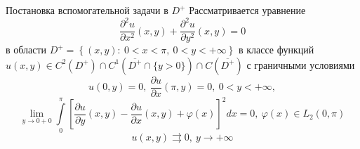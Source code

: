 \documentclass[10pt,pdf,hyperref={unicode}]{beamer}
\begin{document}
\begin{frame}{Постановка вспомогательной задачи в $D^+$}
Рассматривается уравнение
\begin{equation}
	\dfrac{\partial^2 u}{\partial x^2}(x,y) + \dfrac{\partial^2 u}{\partial y^2}(x,y) = 0
\end{equation}
в области $D^{+} = \left\{(x,y): \ 0 < x < \pi, \ 0 < y < + \infty \right\}$ в классе функций $u(x,y) \in  C^2(D^+) \cap C^1(\overline{D^+} \cap \{y > 0\}) \cap C(\overline{D^+})$ 
с граничными условиями 
\begin{equation}
	u(0,y) = 0, \ \dfrac{\partial u}{\partial x}(\pi, y) = 0, \ 0 < y < +\infty, 
\end{equation}
\begin{equation}
	\lim\limits_{y \to 0+0} \int\limits_0^\pi \left[\dfrac{\partial u}{\partial y}(x, y) - \dfrac{\partial u}{\partial x}(x,y) + \varphi(x) \right]^2   dx = 0, \ \varphi(x) \in L_2(0, \pi)
\end{equation}
\begin{equation}
	u(x,y) \rightrightarrows 0, \ y \to +\infty 
\end{equation}
	
\end{frame}
\begin{frame}
	
	
\end{frame}
\end{document}
